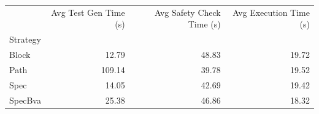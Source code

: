 \begin{tabular}{lrrr}
\toprule
 & Avg Test Gen Time (s) & Avg Safety Check Time (s) & Avg Execution Time (s) \\
Strategy &  &  &  \\
\midrule
Block & 12.79 & 48.83 & 19.72 \\
Path & 109.14 & 39.78 & 19.52 \\
Spec & 14.05 & 42.69 & 19.42 \\
SpecBva & 25.38 & 46.86 & 18.32 \\
\bottomrule
\end{tabular}
